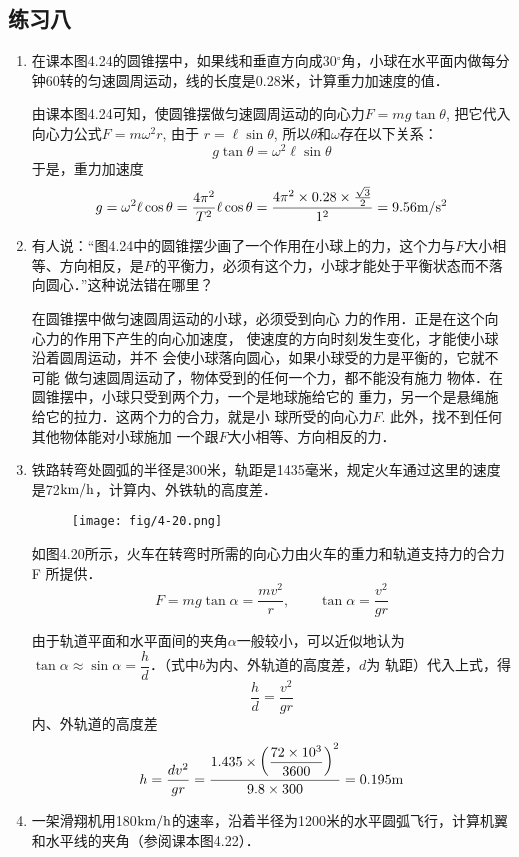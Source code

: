 \subsection{练习八}
\begin{enumerate}
	\item 在课本图4.24的圆锥摆中，如果线和垂直方向成30$^\circ$角，小球在水平面内做每分钟60转的匀速圆周运动，线的长度是0.28米，计算重力加速度的值．

    \begin{solution}
        由课本图4.24可知，使圆锥摆做匀速圆周运动的向心力$F=mg\tan\theta$, 把它代入向心力公式$F=m\omega^2r$, 由于
        $r=\ell\sin\theta$, 所以$\theta$和$\omega$存在以下关系：
\[g\tan\theta=\omega^2\ell\sin\theta\]
于是，重力加速度
\[g=\omega^2\ell\cos\theta=\frac{4\pi^2}{T^2}\ell\cos\theta=\frac{4\pi^2\times 0.28\times \frac{\sqrt{3}}{2}}{1^2}=9.56\text{m}/\text{s}^2\]
    \end{solution}
\item 有人说：“图4.24中的圆锥摆少画了一个作用在小球上的力，这个力与$F$大小相等、方向相反，是$F$的平衡力，必须有这个力，小球才能处于平衡状态而不落向圆心．”这种说法错在哪里？

\begin{solution}
    在圆锥摆中做匀速圆周运动的小球，必须受到向心
    力的作用．正是在这个向心力的作用下产生的向心加速度，
    使速度的方向时刻发生变化，才能使小球沿着圆周运动，并不
    会使小球落向圆心，如果小球受的力是平衡的，它就不可能
    做匀速圆周运动了，物体受到的任何一个力，都不能没有施力
    物体．在圆锥摆中，小球只受到两个力，一个是地球施给它的
    重力，另一个是悬绳施给它的拉力．这两个力的合力，就是小
    球所受的向心力$F$. 此外，找不到任何其他物体能对小球施加
    一个跟$F$大小相等、方向相反的力．
\end{solution}
\item 铁路转弯处圆弧的半径是300米，轨距是1435毫米，规定火车通过这里的速度是72$\text{km}/\text{h}$，计算内、外铁轨的高度差．
\begin{figure}[htp]
    \centering
    \texttt{[image: fig/4-20.png]}
    \caption{}
    \end{figure}

\begin{solution}
    如图4.20所示，火车在转弯时所需的向心力由火车的重力和轨道支持力的合力F
所提供．
\[F=mg\tan\alpha=\frac{mv^2}{r},\qquad \tan\alpha=\frac{v^2}{gr}\]

由于轨道平面和水平面间的夹角$\alpha$一般较小，可以近似地认为$\tan\alpha\approx \sin\alpha=\dfrac{h}{d}$．（式中$b$为内、外轨道的高度差，$d$为
轨距）代入上式，得
\[\frac{h}{d}=\frac{v^2}{gr}\]
内、外轨道的高度差
\[h=\frac{dv^2}{gr}=\frac{1.435\times\left(\dfrac{72\times 10^3}{3600}\right)^2}{9.8\times 300}=0.195{\rm m}\]
\end{solution}
\item 一架滑翔机用180$\text{km}/\text{h}$的速率，沿着半径为1200米的水平圆弧飞行，计算机翼和水平线的夹角（参阅课本图4.22）．


\end{enumerate}
